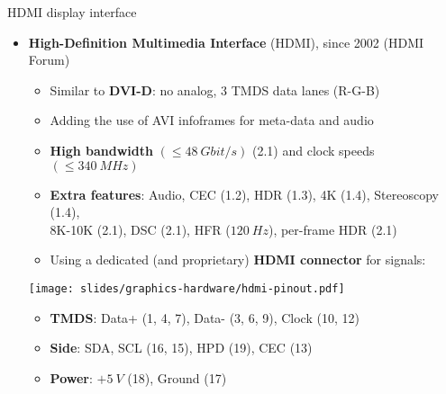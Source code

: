 \begin{frame}{HDMI display interface}
  \begin{itemize}
  \item \textbf{High-Definition Multimedia Interface} (HDMI), since 2002 (HDMI Forum)
    \begin{itemize}
    \item Similar to \textbf{DVI-D}: no analog, 3 TMDS data lanes (R-G-B)
    \item Adding the use of AVI infoframes for meta-data and audio
    \item \textbf{High bandwidth} \((\leq 48~Gbit/s)\) (2.1) and clock speeds \((\leq 340~MHz)\)
    \item \textbf{Extra features}: Audio, CEC (1.2), HDR (1.3), 4K (1.4), Stereoscopy (1.4),\\8K-10K (2.1), DSC (2.1), HFR (\(120~Hz\)), per-frame HDR (2.1)
    \item Using a dedicated (and proprietary) \textbf{HDMI connector} for signals:
    \end{itemize}
  \begin{center}
    \texttt{[image: slides/graphics-hardware/hdmi-pinout.pdf]}
  \end{center}
  \begin{itemize}
  \item \textbf{TMDS}: Data+ {\footnotesize(1, 4, 7)}, Data- {\footnotesize(3, 6, 9)}, Clock {\footnotesize(10, 12)}
  \item \textbf{Side}: SDA, SCL {\footnotesize(16, 15)}, HPD {\footnotesize(19)}, CEC {\footnotesize(13)}
  \item \textbf{Power}: \(+5~V\) {\footnotesize(18)}, Ground {\footnotesize(17)}
  \end{itemize}
  \end{itemize}
\end{frame}

